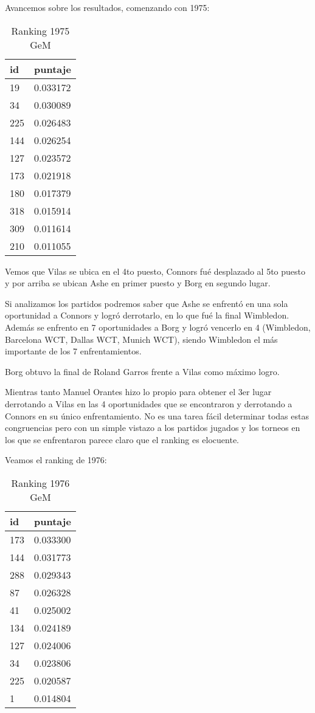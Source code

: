 Avancemos sobre los resultados, comenzando con 1975:

\begin{table}[H]
\label{my-label}
\begin{tabular}{ll}
\hline
id  & puntaje \\ \hline
19  & 0.033172 \\
34  & 0.030089 \\
225 & 0.026483 \\
144 & 0.026254 \\
127 & 0.023572 \\
173 & 0.021918 \\
180 & 0.017379 \\
318 & 0.015914 \\
309 & 0.011614 \\
210 & 0.011055 \\ \hline 
\end{tabular}
\centering
\caption{Ranking 1975 GeM}
\end{table}

Vemos que Vilas se ubica en el 4to puesto, Connors fué desplazado al 5to puesto y por arriba se ubican Ashe en primer puesto y Borg en segundo lugar. 

Si analizamos los partidos podremos saber que Ashe se enfrentó en una sola oportunidad a Connors y logró derrotarlo, en lo que fué la final Wimbledon. Además se enfrento en 7 oportunidades a Borg y logró vencerlo en 4 (Wimbledon, Barcelona WCT, Dallas WCT, Munich WCT), siendo Wimbledon el más importante de los 7 enfrentamientos.

Borg obtuvo la final de Roland Garros frente a Vilas como máximo logro. 

Mientras tanto Manuel Orantes hizo lo propio para obtener el 3er lugar derrotando a Vilas en las 4 oportunidades que se encontraron y derrotando a Connors en su único enfrentamiento. 
No es una tarea fácil determinar todas estas congruencias pero con un simple vistazo a los partidos jugados y los torneos en los que se enfrentaron parece claro que el ranking es elocuente.

Veamos el ranking de 1976:

\begin{table}[H]
\label{my-label}
\begin{tabular}{ll}
\hline
id  & puntaje \\ \hline
173 & 0.033300 \\
144 & 0.031773 \\
288 & 0.029343 \\
87  & 0.026328 \\
41  & 0.025002 \\
134 & 0.024189 \\
127 & 0.024006 \\
34  & 0.023806 \\
225 & 0.020587 \\
1   & 0.014804 \\ \hline 
\end{tabular}
\centering
\caption{Ranking 1976 GeM}
\end{table}

